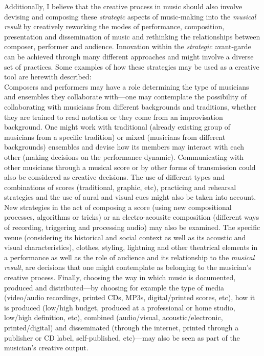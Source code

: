 Additionally, I believe that the creative process in music should also involve devising and composing these \emph{strategic} aspects of music-making into the \emph{musical result} by creatively reworking the modes of performance, composition, presentation and dissemination of music and rethinking the relationships between composer, performer and audience. Innovation within the \emph{strategic} avant-garde can be achieved through many different approaches and might involve a diverse set of practices. Some examples of how these strategies may be used as a creative tool are herewith described:
\\Composers and performers may have a role determining the type of musicians and ensembles they collaborate with---one may contemplate the possibility of collaborating with musicians from different backgrounds and traditions, whether they are trained to read notation or  they come from an improvisation background. One might work with traditional (already existing group of musicians from a specific tradition) or mixed (musicians from different backgrounds) ensembles and devise how its members may interact with each other (making decisions on the performance dynamic). Communicating with other musicians through a musical score or by other forms of transmission could also be considered as creative decisions. The use of different types and combinations of scores (traditional, graphic, etc), practicing and rehearsal strategies and the use of aural and visual cues might also be taken into account. New strategies in the act of composing a score (using new compositional processes, algorithms or tricks) or an electro-acousitc composition (different ways of recording, triggering and processing audio) may also be examined. The specific venue (considering its historical and social context as well as its acoustic and visual characteristics), clothes, styling, lightning and other theatrical elements in a performance as well as the role of audience and its relationship to the \emph{musical result}, are decisions that one might contemplate as belonging to the musician's creative process. Finally, choosing the way in which music is documented, produced and distributed---by choosing for example the type of media (video/audio recordings, printed CDs, MP3s, digital/printed scores, etc), how it is produced (low/high budget, produced at a professional or home studio, low/high definition, etc), combined (audio/visual, acoustic/electronic, printed/digital) and disseminated (through the internet, printed through a publisher or CD label, self-published, etc)---may also be seen as part of the musician's creative output. 

